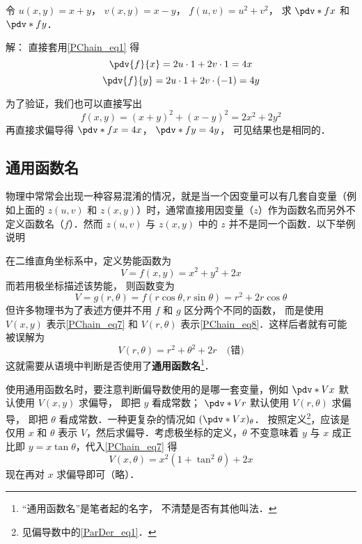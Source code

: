 \begin{example}{}
令 $u(x,y) = x + y$， $v(x,y) = x - y$， $f(u, v) = u^2 + v^2$， 求 $\pdv*{f}{x}$ 和 $\pdv*{f}{y}$．

解： 直接套用\autoref{PChain_eq1} 得
\begin{equation}
\pdv{f}{x} = 2u \cdot 1 + 2v \cdot 1 = 4x
\end{equation}
\begin{equation}
\pdv{f}{y} = 2u \cdot 1 + 2v \cdot (-1) = 4y
\end{equation}

为了验证，我们也可以直接写出
\begin{equation}
f(x, y) = (x+y)^2 + (x-y)^2 = 2x^2 + 2y^2
\end{equation}
再直接求偏导得 $\pdv*{f}{x} = 4x$， $\pdv*{f}{y} = 4y$， 可见结果也是相同的．
\end{example}

\subsection{通用函数名}
物理中常常会出现一种容易混淆的情况，就是当一个因变量可以有几套自变量（例如上面的 $z(u,v)$ 和 $z(x,y)$）时，通常直接用因变量（$z$）作为函数名而另外不定义函数名（$f$）．然而 $z(u,v)$ 与 $z(x,y)$ 中的 $z$ 并不是同一个函数．以下举例说明

\begin{example}{}\label{PChain_ex1}
在二维直角坐标系中，定义势能函数为
\begin{equation}\label{PChain_eq7}
V=f(x,y)=x^2+y^2+2x
\end{equation}
而若用极坐标描述该势能， 则函数变为
\begin{equation}\label{PChain_eq8}
V = g(r,\theta) = f(r\cos \theta , r\sin \theta ) = r^2 + 2r\cos \theta
\end{equation}
但许多物理书为了表述方便并不用 $f$ 和 $g$ 区分两个不同的函数， 而是使用 $V(x,y)$ 表示\autoref{PChain_eq7} 和 $V(r,\theta)$ 表示\autoref{PChain_eq8}．这样后者就有可能被误解为
\begin{equation}
V(r,\theta) = r^2+\theta^2+2r \quad \text{(错)}
\end{equation}
这就需要从语境中判断是否使用了\textbf{通用函数名}\footnote{“通用函数名”是笔者起的名字， 不清楚是否有其他叫法．}．

使用通用函数名时，要注意判断偏导数使用的是哪一套变量，例如 $\pdv*{V}{x}$ 默认使用 $V(x,y)$ 求偏导， 即把 $y$ 看成常数； $\pdv*{V}{r}$ 默认使用 $V(r,\theta)$ 求偏导， 即把 $\theta$ 看成常数．一种更复杂的情况如 $(\pdv*{V}{x})_\theta$． 按照定义\footnote{见偏导数中的\autoref{ParDer_eq1}．}，应该是仅用 $x$ 和 $\theta$ 表示 $V$，然后求偏导．考虑极坐标的定义，$\theta$ 不变意味着 $y$ 与 $x$ 成正比即 $y=x\tan\theta$，代入\autoref{PChain_eq7} 得
\begin{equation}
V(x,\theta)=x^2(1+\tan^2 \theta) + 2x
\end{equation}
现在再对 $x$ 求偏导即可（略）．
\end{example}

